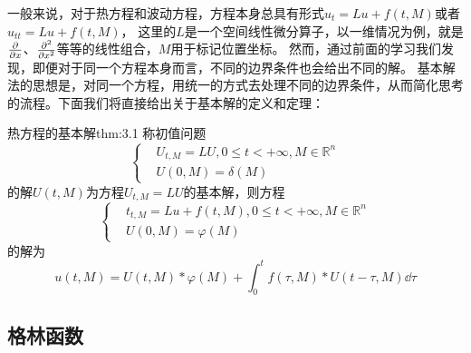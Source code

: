 一般来说，对于热方程和波动方程，方程本身总具有形式$u_t = Lu + f(t, M)$或者$u_{tt} = Lu + f(t, M)$，
这里的$L$是一个空间线性微分算子，以一维情况为例，就是$\pdv{}{x}$、$\pdv[2]{}{x}$等等的线性组合，$M$用于标记位置坐标。
然而，通过前面的学习我们发现，即便对于同一个方程本身而言，不同的边界条件也会给出不同的解。
基本解法的思想是，对同一个方程，用统一的方式去处理不同的边界条件，从而简化思考的流程。下面我们将直接给出关于基本解的定义和定理：
\begin{theorem}{热方程的基本解}{thm:3.1}
    称初值问题
    \begin{equation*}
        \left\{
            \begin{aligned}
                &U_{t, M} = LU, 0 \leq t < +\infty, M \in \mathbb{R}^n\\
                &U(0, M) = \delta(M)
            \end{aligned}
        \right.
    \end{equation*}
    的解$U(t, M)$为方程$U_{t, M} = LU$的基本解，则方程
    \begin{equation*}
        \left\{
            \begin{aligned}
                &t_{t, M} = Lu + f(t, M), 0 \leq t < +\infty, M \in \mathbb{R}^n\\
                &U(0, M) = \varphi(M)
            \end{aligned}
        \right.
    \end{equation*}
    的解为
    \[u(t, M) = U(t, M) * \varphi(M) + \int_{0}^{t} f(\tau, M) * U(t - \tau, M) \dd{\tau}\]
\end{theorem}
\subsection{格林函数}